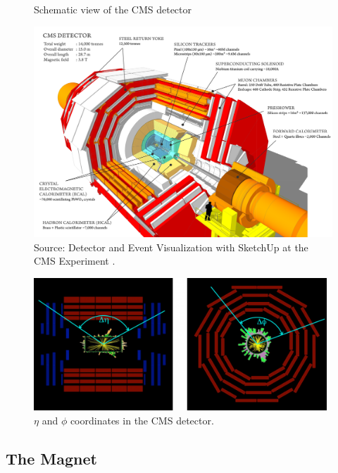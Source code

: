 \begin{figure}[h]
\caption{Schematic view of the CMS detector \label{figure:CMS}}
  \centering
\includegraphics[width=12cm]{CMS_chapter_plots/cms_120918_03}
\caption*{Source: Detector and Event Visualization with SketchUp at the
                        CMS Experiment \cite{Sakuma:2013jqa}.}
\end{figure}

\begin{figure}[H]
\caption{$\eta$ and $\phi$ coordinates in the CMS detector. \label{figure:eta}}
  \centering
\includegraphics[width=11cm]{CMS_chapter_plots/image_eta}
\end{figure}

\subsection{The Magnet}

